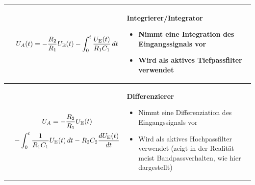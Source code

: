 \begin{table}[ht]
\begin{tabular}{|m{}|m{}|m{}|}
        
                  &
        \begin{center}
            
            \[
                U_A(t) = - \frac{R_2}{R_1} U_{\textnormal{E}}(t) - \int_0^t \frac{U_{\textnormal{E}}(t)}{R_1 C_1} \, dt
            \]
        \end{center}
                  &
        \textbf{Integrierer/Integrator}
        \index{Operationsverstärker>Integrierer}
        \begin{itemize}[leftmargin=0.4cm, parsep=0.0cm, itemsep=2pt, topsep=2pt]
            \item Nimmt eine Integration des Eingangssignals vor
            \item Wird als aktives Tiefpassfilter verwendet
        \end{itemize}
        \\
        \hline
        
                  &
        \begin{center}
            
            \begin{multline*}
                U_A = - \frac{R_2}{R_1} U_{\textnormal{E}}(t) \\
                - \int_0^t \frac{1}{R_1 C_1} U_{\textnormal{E}}(t) \, dt
                - R_2 C_2\frac{dU_{\textnormal{E}}(t)}{dt}
            \end{multline*}
        \end{center}
                  &
        \textbf{Differenzierer}
        \index{Operationsverstärker>Differenzierer}
        \begin{itemize}[leftmargin=0.4cm, parsep=0.0cm, itemsep=2pt, topsep=2pt]
            \item Nimmt eine Differenziation des Eingangssignals vor
            \item Wird als aktives Hochpassfilter verwendet (zeigt in der Realität meist Bandpassverhalten, wie hier dargestellt)
        \end{itemize}
        \\
        \hline
    \end{tabular}
\end{table}






